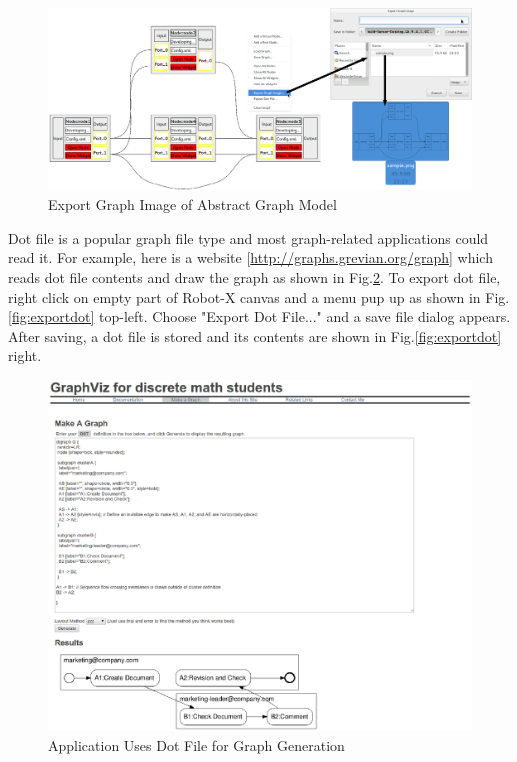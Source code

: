 \documentclass[a4paper,10pt]{book}
\begin{document}
\begin{figure}
 \centering
 \includegraphics[width=1.0\textwidth]{img/exportimage.eps}
 \caption{Export Graph Image of Abstract Graph Model}
 \label{fig:exportimage}
\end{figure}

Dot file is a popular graph file type and most graph-related applications could read it. For example, here is a website [\url{http://graphs.grevian.org/graph}] which reads dot file contents and draw the graph as shown in Fig.\ref{fig:dotfile}. To export dot file, right click on empty part of Robot-X canvas and a menu pup up as shown in Fig.\ref{fig:exportdot} top-left. Choose "Export Dot File..." and a save file dialog appears. After saving, a dot file is stored and its contents are shown in 
Fig.\ref{fig:exportdot} right.

\begin{figure}
 \centering
 \includegraphics[width=1.0\textwidth]{img/dotfile.eps}
 \caption{Application Uses Dot File for Graph Generation}
 \label{fig:dotfile}
\end{figure}
\end{document}
